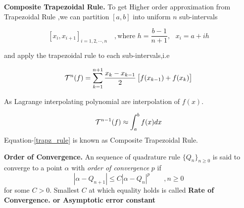 \documentclass[../document.tex]{subfiles}
\begin{document}
	\begin{simp_num}{\normalfont\textbf{Composite Trapezoidal Rule.}}
		To get Higher order approximation from Trapezoidal Rule ,we can partition $[a,b]$ into uniform $n$ sub-intervals 
		
		$$[x_{i},x_{i+1}]_{i=1,2,\cdots,n}  
		\quad, \text{where } 
		h =\frac{b-1}{n+1},
		\text{ }
		x_i = a+ih $$
		
		and apply the trapezoidal rule to each sub-intervals,i.e
		
		
		
		\begin{equation}  \label{trapz_rule}
			\mathcal{T}^{n} (f) = 
			\sum_{k=1}^{n+1}
			\frac{x_k -x_{k-1}}{2}
			\left[ f(x_{k-1}) +f(x_k)  \right]
		\end{equation}
		
		As Lagrange interpolating polynomial are interpolation of $f(x)$.
		
		$$
		\mathcal{T}^{n-1} (f) \approx \int_a^b f(x)dx
		$$
		Equation-\eqref{trapz_rule} is known as Composite Trapezoidal Rule.
	\end{simp_num}
	\begin{simp_num}{\normalfont\textbf{Order of Convergence.}} An sequence of quadrature rule $\{Q_n\}_{n\geq0}$ is said to converge to a point $\alpha$ with \emph{order of convergence} $p$ if
		$$
		|\alpha - Q_{n+1}| \le  C|\alpha -Q_n|^p  \qquad , n\geq0
		$$
		for some $C>0$. Smallest  $C$ at which equality holds is called  
		{\normalfont\textbf{Rate of Convergence. {\normalfont or} Asymptotic error constant}}
		
	\end{simp_num}
	
\end{document}
